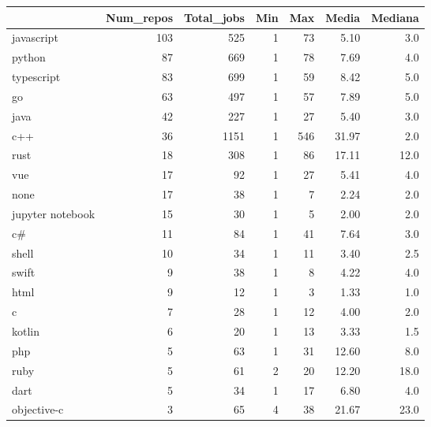\begin{tabular}{lrrrrrr}
\toprule
{} &  Num\_repos &  Total\_jobs &  Min &  Max &  Media &  Mediana \\
\midrule
javascript       &        103 &         525 &    1 &   73 &   5.10 &      3.0 \\
python           &         87 &         669 &    1 &   78 &   7.69 &      4.0 \\
typescript       &         83 &         699 &    1 &   59 &   8.42 &      5.0 \\
go               &         63 &         497 &    1 &   57 &   7.89 &      5.0 \\
java             &         42 &         227 &    1 &   27 &   5.40 &      3.0 \\
c++              &         36 &        1151 &    1 &  546 &  31.97 &      2.0 \\
rust             &         18 &         308 &    1 &   86 &  17.11 &     12.0 \\
vue              &         17 &          92 &    1 &   27 &   5.41 &      4.0 \\
none             &         17 &          38 &    1 &    7 &   2.24 &      2.0 \\
jupyter notebook &         15 &          30 &    1 &    5 &   2.00 &      2.0 \\
c\#               &         11 &          84 &    1 &   41 &   7.64 &      3.0 \\
shell            &         10 &          34 &    1 &   11 &   3.40 &      2.5 \\
swift            &          9 &          38 &    1 &    8 &   4.22 &      4.0 \\
html             &          9 &          12 &    1 &    3 &   1.33 &      1.0 \\
c                &          7 &          28 &    1 &   12 &   4.00 &      2.0 \\
kotlin           &          6 &          20 &    1 &   13 &   3.33 &      1.5 \\
php              &          5 &          63 &    1 &   31 &  12.60 &      8.0 \\
ruby             &          5 &          61 &    2 &   20 &  12.20 &     18.0 \\
dart             &          5 &          34 &    1 &   17 &   6.80 &      4.0 \\
objective-c      &          3 &          65 &    4 &   38 &  21.67 &     23.0 \\

\end{tabular}
